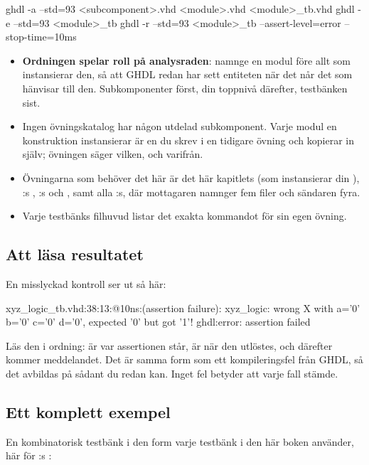 \begin{shell}
ghdl -a --std=93 <subcomponent>.vhd <module>.vhd <module>_tb.vhd
ghdl -e --std=93 <module>_tb
ghdl -r --std=93 <module>_tb --assert-level=error --stop-time=10ms
\end{shell}

\begin{itemize}
  \item \textbf{Ordningen spelar roll på analysraden}: namnge en modul före allt som instansierar
    den, så att GHDL redan har sett entiteten när det når det  som
    hänvisar till den. Subkomponenter först, din toppnivå därefter, testbänken sist.
  \item Ingen övningskatalog har någon utdelad subkomponent. Varje modul en konstruktion
    instansierar är en du skrev i en tidigare övning och kopierar in själv; övningen säger vilken,
    och varifrån.
  \item Övningarna som behöver det här är det här kapitlets  (som instansierar
    din ), :s , :s
     och , samt alla :s, där mottagaren namnger fem
    filer och sändaren fyra.
  \item Varje testbänks filhuvud listar det exakta kommandot för sin egen övning.
\end{itemize}

\subsection{Att läsa resultatet}
\label{c2:sub:result}
En misslyckad kontroll ser ut så här:

\begin{console}
xyz_logic_tb.vhd:38:13:@10ns:(assertion failure): xyz_logic: wrong X with a='0' b='0' c='0' d='0', expected '0' but got '1'!
ghdl:error: assertion failed
\end{console}

Läs den i ordning:  är var assertionen står,  är när den utlöstes, och
därefter kommer meddelandet. Det är samma form som ett kompileringsfel från GHDL, så det avbildas
på sådant du redan kan. Inget fel betyder att varje fall stämde.

\subsection{Ett komplett exempel}
\label{c2:sub:example}
En kombinatorisk testbänk i den form varje testbänk i den här boken använder, här för
:s :

